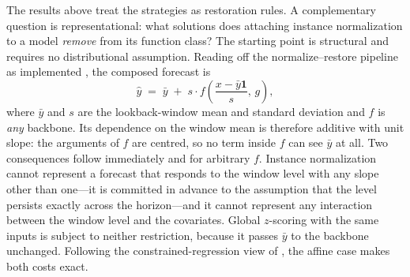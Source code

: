 The results above treat the strategies as restoration rules. A complementary question is representational: what solutions does attaching instance normalization to a model \emph{remove} from its function class? The starting point is structural and requires no distributional assumption. Reading off the normalize--restore pipeline as implemented \citep{kim2022revin}, the composed forecast is
\begin{equation}\label{eq:equivariance}
  \hat y \;=\; \bar y \;+\; s \cdot f\!\left(\frac{x - \bar y \mathbf{1}}{s},\, g\right),
\end{equation}
where $\bar y$ and $s$ are the lookback-window mean and standard deviation and $f$ is \emph{any} backbone. Its dependence on the window mean is therefore additive with unit slope: the arguments of $f$ are centred, so no term inside $f$ can see $\bar y$ at all. Two consequences follow immediately and for arbitrary $f$. Instance normalization cannot represent a forecast that responds to the window level with any slope other than one---it is committed in advance to the assumption that the level persists exactly across the horizon---and it cannot represent any interaction between the window level and the covariates. Global $z$-scoring with the same inputs is subject to neither restriction, because it passes $\bar y$ to the backbone unchanged. Following the constrained-regression view of \citet{toner2024linear}, the affine case makes both costs exact.

